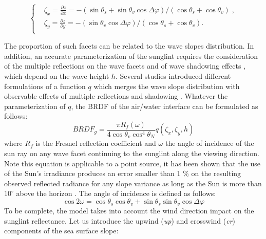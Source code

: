 \documentclass{article}
\begin{document}
\begin{equation}
\begin{cases}
  & {{\zeta }_{x}}=\frac{\partial z}{\partial x}={-\left( \sin {{\theta }_{s}}+\sin {{\theta }_{v}}\cos \Delta \varphi  \right)}/{\left( \cos {{\theta }_{s}}+\cos {{\theta }_{v}} \right)}\;, \\
 & {{\zeta }_{y}}=\frac{\partial z}{\partial y}={-\left( \sin {{\theta }_{v}}\cos \Delta \varphi  \right)}/{\left( \cos {{\theta }_{s}}+\cos {{\theta }_{v}} \right).}\; \\

\end{cases}
\label{eq:placeholder}
\end{equation}

The proportion of such facets can be related to the wave slopes distribution. In addition, an accurate parameterization of the sunglint requires the consideration of the multiple reflections on the wave facets \cite{Ottaviani2008a, Li2013a} and of wave shadowing effects \cite{Ross2005}, which depend on the wave height $h$. Several studies introduced different formulations of a function $q$ which merges the wave slope distribution with observable effects of multiple reflections and shadowing \cite{Plass1975,Ross2005}. Whatever the parameterization of $q$, the BRDF of the air/water interface can be formulated as follows:
\begin{equation}
BRDF_{g}=\frac{\pi {{R}_{f}}\left( \omega  \right)}{4\cos {{\theta }_{v}}\cos ^{4}{{\theta }_{N}}}q\left( {{\zeta }_{x}},{{\zeta }_{y}},h \right)
\label{eq:placeholder}
\end{equation}       	                    	
where $R_f$ is the Fresnel reflection coefficient and $\omega$ the angle of incidence of the sun ray on any wave facet continuing to the sunglint along the viewing direction. Note this equation is applicable to a point source, it has been shown that the use of the Sun’s irradiance produces an error smaller than 1 \% on the resulting observed reflected radiance for any slope variance as long as the Sun is more than $10^\circ$ above the horizon \cite{Ross2005}.  The angle of incidence is defined as follows:
\begin{equation}
  \cos{2\omega}=\cos{\theta_s}\cos{\theta_v}+\sin{\theta_s}\sin{\theta_v}\cos{\Delta\varphi} 
 \label{eq:placeholder}
\end{equation}
To be complete, the model takes into account the wind direction impact on the sunglint reflectance. Let us introduce the upwind (\textit{up}) and crosswind (\textit{cr}) components of the sea surface slope:
\end{document}
